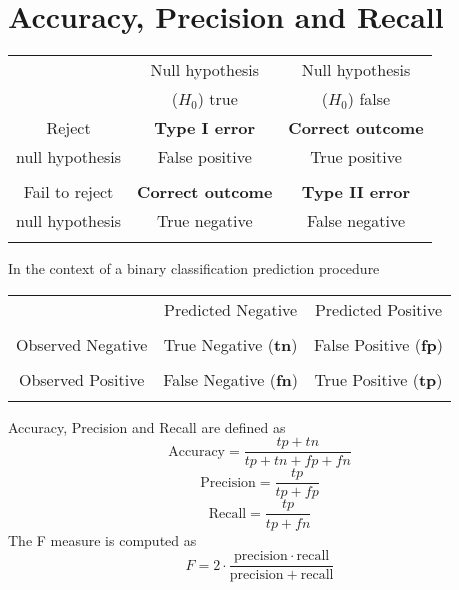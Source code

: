 \documentclass[a4paper,12pt]{article}
\begin{document}
\large 

\section*{Accuracy, Precision and Recall}
\begin{center}
	\begin{tabular}{|c||c|c|} \hline
		& Null hypothesis & Null hypothesis   \\
		& ($H_0$) true	 & ($H_0$) false \\ \hline \hline
		Reject 	       & \textbf{Type I error }   & \textbf{Correct outcome} \\
		null hypothesis& False positive  & True positive \\ 
		 & &  \\ \hline
		Fail to reject & \textbf{Correct outcome} & \textbf{Type II error} \\
		null hypothesis & True negative  & False negative \\ 
		& & \\ \hline
	\end{tabular} 
\end{center}
\bigskip
In the context of a binary classification prediction procedure 
\begin{center}
	\begin{tabular}{|c||c|c|}
		\hline  & \phantom{spa} Predicted Negative \phantom{spa} & \phantom{spa} Predicted Positive\phantom{spa} \\ 
		 & &  \\ \hline \hline
		Observed Negative\phantom{spa} & True Negative \;(\textbf{tn}) & False Positive \;(\textbf{fp})\\ 
		 & &  \\ \hline
		Observed Positive\phantom{spa} & False Negative \;(\textbf{fn}) & True Positive \;(\textbf{tp}) \\ 
		 & &  \\ \hline
	\end{tabular} 
\end{center}
\medskip 
\noindent Accuracy, Precision and Recall are defined as
\[\mbox{Accuracy}=\frac{tp+tn}{tp+tn+fp+fn} \]
\[\mbox{Precision}=\frac{tp}{tp+fp} \] 
\[\mbox{Recall}=\frac{tp}{tp+fn} \]
\medskip 
\noindent The F measure is computed as
\[F = 2 \cdot \frac{\mathrm{precision} \cdot \mathrm{recall}}{ \mathrm{precision} + \mathrm{recall}}\]
\end{document}
